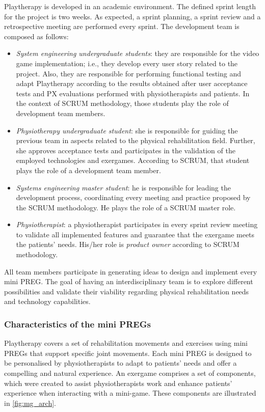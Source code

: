 Playtherapy is developed in an academic environment. The defined sprint length for the project is two weeks. As expected, a sprint planning, a sprint review and a retrospective meeting are performed every sprint. The development team is composed as follows:
\begin{itemize}
    \item \emph{System engineering undergraduate students}: they are responsible for the video game implementation; i.e., they develop every user story related to the project. Also, they are responsible for performing functional testing and adapt Playtherapy according to the results obtained after user acceptance tests and \ac{PX} evaluations performed with physiotherapists and patients. In the context of SCRUM methodology, those students play the role of development team members.
    \item \emph{Physiotherapy undergraduate student}: she is responsible for guiding the previous team in aspects related to the physical rehabilitation field. Further, she approves acceptance tests and participates in the validation of the employed technologies and exergames. According to SCRUM, that student plays the role of a development team member.
    \item \emph{Systems engineering master student}: he is responsible for leading the development process, coordinating every meeting and practice proposed by the SCRUM methodology. He plays the role of a SCRUM master role.
    \item \emph{Physiotherapist}: a physiotherapist participates in every sprint review meeting to validate all implemented features and guarantee that the exergame meets the patients' needs. His/her role is \textit{product owner} according to SCRUM methodology.
\end{itemize}

All team members participate in generating ideas to design and implement every mini \ac{PREG}. The goal of having an interdisciplinary team is to explore different possibilities and validate their viability regarding physical rehabilitation needs and technology capabilities.

\subsubsection{Characteristics of the mini \acp{PREG}}
Playtherapy covers a set of rehabilitation movements and exercises using mini \acp{PREG} that support specific joint movements. Each mini \ac{PREG} is designed to be personalised by physiotherapists to adapt to patients' needs and offer a compelling and natural experience. An exergame comprises a set of components, which were created to assist physiotherapists work and enhance patients' experience when interacting with a mini-game. These components are illustrated in \autoref{fig:mg_arch}.

